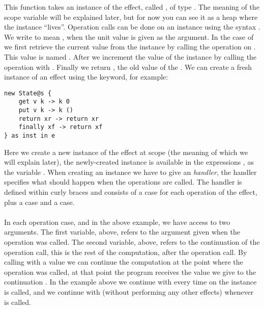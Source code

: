 This function takes an instance of the  effect, called , of type .
The meaning of the scope variable  will be explained later, but for now you can see it as a heap where the instance ``lives''.
Operation calls can be done on an instance using the syntax .
We write  to mean , when the unit value \ident{()} is given as the argument.
In the case of  we first retrieve the current value from the instance by calling the  operation on .
This value is named .
After we increment the value of the instance by calling the  operation with .
Finally we return , the old value of the .
\newpage
We can create a fresh instance of an effect using the  keyword, for example:
\begin{verbatim}
new State@s {
	get v k -> k 0
	put v k -> k ()
	return xr -> return xr
	finally xf -> return xf
} as inst in e
\end{verbatim}
Here we create a new instance of the  effect at scope  (the meaning of which we will explain later), the newly-created instance is available in the expressions , as the variable .
When creating an instance we have to give an \emph{handler}, the handler specifies what should happen when the operations are called.
The handler is defined within curly braces and consists of a case for each operation of the effect, plus a  case and a  case.
\\\\
In each operation case,  and  in the above example, we have access to two arguments.
The first variable,  above, refers to the argument given when the operation was called.
The second variable,  above, refers to the continuation of the operation call, this is the rest of the computation, after the operation call.
By calling  with a value we can continue the computation at the point where the operation was called, at that point the program receives the value we give to the continuation .
In the example above we continue with  every time  on the instance  is called, and we continue with \ident{()} (without performing any other effects) whenever  is called.
\\\\
